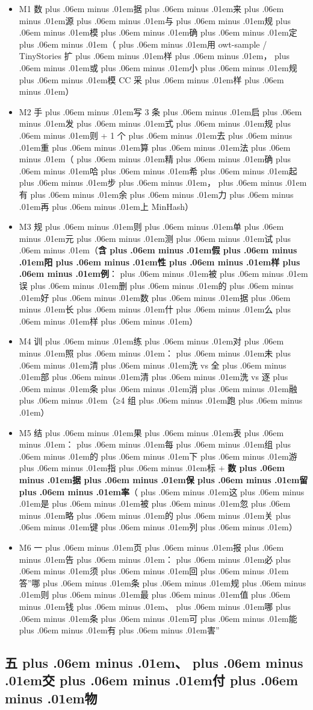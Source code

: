 \documentclass[
]{article}
\providecommand{\tightlist}{%
  \setlength{\itemsep}{0pt}\setlength{\parskip}{0pt}}
\def\zh#1{{\zhfont #1}}
\def\sym#1{{\symfont #1}}
\def\zhglue{\hskip0pt plus .06em minus .01em}
\begin{document}
\begin{itemize}
\tightlist
\item[$\square$]
  M1 \zh{数\zhglue 据\zhglue 来\zhglue 源\zhglue 与\zhglue 规\zhglue 模\zhglue 确\zhglue 定\zhglue （\zhglue 用} owt-sample / TinyStories \zh{扩\zhglue 样\zhglue ，\zhglue 或\zhglue 小\zhglue 规\zhglue 模} CC \zh{采\zhglue 样\zhglue ）}
\item[$\square$]
  M2 \zh{手\zhglue 写} 3 \zh{条\zhglue 启\zhglue 发\zhglue 式\zhglue 规\zhglue 则} + 1 \zh{个\zhglue 去\zhglue 重\zhglue 算\zhglue 法\zhglue （\zhglue 精\zhglue 确\zhglue 哈\zhglue 希\zhglue 起\zhglue 步\zhglue ，\zhglue 有\zhglue 余\zhglue 力\zhglue 再\zhglue 上} MinHash\zh{）}
\item[$\square$]
  M3 \zh{规\zhglue 则\zhglue 单\zhglue 元\zhglue 测\zhglue 试\zhglue （}\textbf{\zh{含\zhglue 假\zhglue 阳\zhglue 性\zhglue 样\zhglue 例}}\zh{：\zhglue 被\zhglue 误\zhglue 删\zhglue 的\zhglue 好\zhglue 数\zhglue 据\zhglue 长\zhglue 什\zhglue 么\zhglue 样\zhglue ）}
\item[$\square$]
  M4 \zh{训\zhglue 练\zhglue 对\zhglue 照\zhglue ：\zhglue 未\zhglue 清\zhglue 洗} vs \zh{全\zhglue 部\zhglue 清\zhglue 洗} vs \zh{逐\zhglue 条\zhglue 消\zhglue 融\zhglue （}\sym{≥}4 \zh{组\zhglue 跑\zhglue ）}
\item[$\square$]
  M5 \zh{结\zhglue 果\zhglue 表\zhglue ：\zhglue 每\zhglue 组\zhglue 的\zhglue 下\zhglue 游\zhglue 指\zhglue 标} + \textbf{\zh{数\zhglue 据\zhglue 保\zhglue 留\zhglue 率}}\zh{（\zhglue 这\zhglue 是\zhglue 被\zhglue 忽\zhglue 略\zhglue 的\zhglue 关\zhglue 键\zhglue 列\zhglue ）}
\item[$\square$]
  M6 \zh{一\zhglue 页\zhglue 报\zhglue 告\zhglue ：\zhglue 必\zhglue 须\zhglue 回\zhglue 答}''\zh{哪\zhglue 条\zhglue 规\zhglue 则\zhglue 最\zhglue 值\zhglue 钱\zhglue 、\zhglue 哪\zhglue 条\zhglue 可\zhglue 能\zhglue 有\zhglue 害}''
\end{itemize}

\subsection{\zh{五\zhglue 、\zhglue 交\zhglue 付\zhglue 物}}\label{ux4e94ux4ea4ux4ed8ux7269-5}
\end{document}
